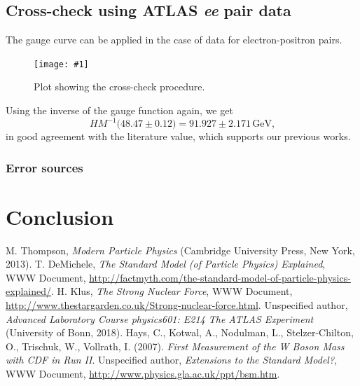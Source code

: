 \documentclass[twocolumn]{article}
\newcommand{\insertFigure}[1]{%
   \texttt{[image: \#1]}%
}
\begin{document}
\subsection{Cross-check using ATLAS \textit{ee} pair data}
The gauge curve can be applied in the case of data for electron-positron pairs. 
\begin{figure}[!h]
\centering
\insertFigure{Images/ZeeCheckLabeled.png}
\caption{Plot showing the cross-check procedure.}
\label{fig:crosscheck}
\end{figure}
Using the inverse of the gauge function again, we get
\begin{equation}
HM^{-1} \big(48.47 \pm 0.12\big) = 91.927 \pm 2.171 \, \text{GeV,}
\end{equation}
in good agreement with the literature value, which supports our previous works.
\subsubsection{Error sources}
\section{Conclusion}
\begin{thebibliography}{9}
M. Thompson, \textsl{Modern Particle Physics} (Cambridge University Press, New York, 2013).
T. DeMichele, \textit{The Standard Model (of Particle Physics) Explained}, WWW Document, \url{http://factmyth.com/the-standard-model-of-particle-physics-explained/}.
H. Klus, \textit{The Strong Nuclear Force}, WWW Document, \url{http://www.thestargarden.co.uk/Strong-nuclear-force.html}.
Unspecified author, \textsl{Advanced Laboratory Course physics601: E214 The ATLAS Experiment} (University of Bonn, 2018).
Hays, C., Kotwal, A., Nodulman, L., Stelzer-Chilton, O., Trischuk, W., Vollrath, I. (2007). \textsl{First Measurement of the W Boson Mass with CDF in Run II}.
Unspecified author, \textsl{Extensions to the Standard Model?}, WWW Document, \url{http://www.physics.gla.ac.uk/ppt/bsm.htm}.
\end{thebibliography}
\newpage
\onecolumn
\end{document}
